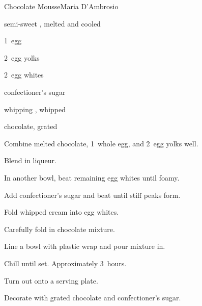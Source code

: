 \begin{recipe}{Chocolate Mousse}{Maria D'Ambrosio}{}

\begin{ingredients}
\item {} semi-sweet , melted and cooled
\item 1~egg
\item 2~egg yolks
\item 2~egg whites
\item {} 
\item {} confectioner's sugar
\item {} whipping , whipped
\item {} chocolate, grated
\end{ingredients}

\begin{directions}
\item Combine melted chocolate, 1~whole egg, and 2~egg yolks well.
\item Blend in liqueur.
\item In another bowl, beat remaining egg whites until foamy.
\item Add confectioner's sugar and beat until stiff peaks form.
\item Fold whipped cream into egg whites.
\item Carefully fold in chocolate mixture.
\item Line a  bowl with plastic wrap and pour mixture in.
\item Chill until set. Approximately 3~hours.
\item Turn out onto a serving plate.
\item Decorate with grated chocolate and confectioner's sugar.
\end{directions}

\end{recipe}
